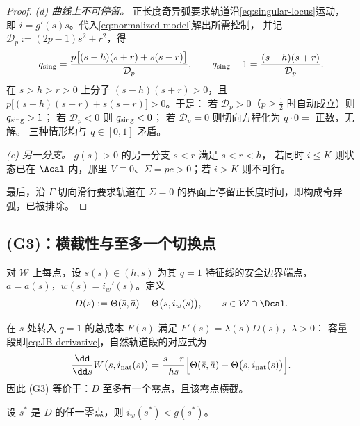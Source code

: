\begin{proof}
\emph{(d) 曲线上不可停留。} 正长度奇异弧要求轨道沿\eqref{eq:singular-locus}运动，
即 $\dot i=g'(s)\dot s$。代入\eqref{eq:normalized-model}解出所需控制，
并记 $\mathcal D_p:=(2p-1)s^2+r^2$，得
\begin{equation}
q_{\rm sing}=\frac{p\bigl[(s-h)(s+r)+s(s-r)\bigr]}{\mathcal D_p},
\qquad
q_{\rm sing}-1=\frac{(s-h)(s+r)}{\mathcal D_p}.
\label{eq:q-sing}
\end{equation}
在 $s>h>r>0$ 上分子 $(s-h)(s+r)>0$，且
$p\bigl[(s-h)(s+r)+s(s-r)\bigr]>0$。于是：
若 $\mathcal D_p>0$（$p\ge\frac12$ 时自动成立）则 $q_{\rm sing}>1$；
若 $\mathcal D_p<0$ 则 $q_{\rm sing}<0$；
若 $\mathcal D_p=0$ 则切向方程化为 $q\cdot0=$ 正数，无解。
三种情形均与 $q\in[0,1]$ 矛盾。

\emph{(e) 另一分支。} $g(s)>0$ 的另一分支 $s<r$ 满足 $s<r<h$，
若同时 $i\le K$ 则状态已在 $\Acal$ 内，那里 $V\equiv0$、$\Sigma=pc>0$；若 $i>K$ 则不可行。

最后，沿 $\Gamma$ 切向滑行要求轨道在 $\Sigma=0$ 的界面上停留正长度时间，即构成奇异弧，已被排除。
\end{proof}

\subsection{(G3)：横截性与至多一个切换点}
\label{sec:G3}

\begin{definition}[统一残差]
对 $\mathcal W$ 上每点，设 $\bar s(s)\in(h,s)$ 为其 $q=1$ 特征线的安全边界端点，
$\bar a=a(\bar s)$，$w(s)=i_w'(s)$。定义
\begin{equation}
D(s):=\Theta(\bar s,\bar a)-\Theta\bigl(s,i_w(s)\bigr),\qquad s\in\mathcal W\cap\Dcal .
\label{eq:unified-residual}
\end{equation}
\end{definition}

在 $s$ 处转入 $q=1$ 的总成本 $F(s)$ 满足 $F'(s)=\lambda(s)D(s)$，$\lambda>0$：
容量段即\eqref{eq:JB-derivative}，自然轨道段的对应式为
\begin{equation}
\frac{\dd}{\dd s}W\bigl(s,i_{\rm nat}(s)\bigr)
=\frac{s-r}{hs}\Bigl[\Theta(\bar s,\bar a)-\Theta\bigl(s,i_{\rm nat}(s)\bigr)\Bigr].
\label{eq:JD-derivative}
\end{equation}
因此 (G3) 等价于：$D$ 至多有一个零点，且该零点横截。

\begin{lemma}[零点位于奇异曲线下方]
\label{lem:below-g}
设 $s^*$ 是 $D$ 的任一零点，则 $i_w(s^*)<g(s^*)$。
\end{lemma}

